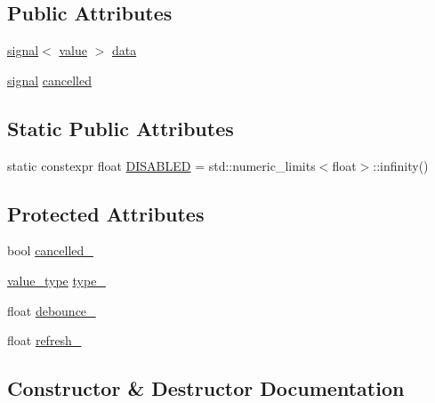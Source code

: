 \subsection*{Public Attributes}
\begin{DoxyCompactItemize}
\item 
\hyperlink{classtelegraph_1_1signal}{signal}$<$ \hyperlink{classtelegraph_1_1value}{value} $>$ \hyperlink{classtelegraph_1_1subscription_adaaff860567d8a1dd105cd1fcc91a840}{data}
\item 
\hyperlink{classtelegraph_1_1signal}{signal} \hyperlink{classtelegraph_1_1subscription_af871f21ea83b527626725c9fedc247f2}{cancelled}
\end{DoxyCompactItemize}
\subsection*{Static Public Attributes}
\begin{DoxyCompactItemize}
\item 
static constexpr float \hyperlink{classtelegraph_1_1subscription_a193bc79b41f19075b015c7af7c1f7738}{D\+I\+S\+A\+B\+L\+ED} = std\+::numeric\+\_\+limits$<$float$>$\+::infinity()
\end{DoxyCompactItemize}
\subsection*{Protected Attributes}
\begin{DoxyCompactItemize}
\item 
bool \hyperlink{classtelegraph_1_1subscription_a4a52c45f257a495f0ced91d5e9cc3723}{cancelled\+\_\+}
\item 
\hyperlink{classtelegraph_1_1value__type}{value\+\_\+type} \hyperlink{classtelegraph_1_1subscription_a1f168a6bb8f030ebc870e1a702192139}{type\+\_\+}
\item 
float \hyperlink{classtelegraph_1_1subscription_a81abb8423637f2519d24a319f3f45cf0}{debounce\+\_\+}
\item 
float \hyperlink{classtelegraph_1_1subscription_aaae42162bcfb0f4e6e75f4a3e36de6d9}{refresh\+\_\+}
\end{DoxyCompactItemize}


\subsection{Constructor \& Destructor Documentation}
\mbox{\label{classtelegraph_1_1subscription_ae4c98364487057db2aa99675dac8afb5}} 
